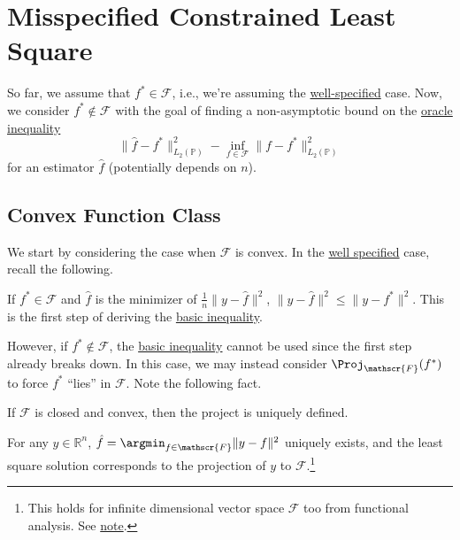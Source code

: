 \section{Misspecified Constrained Least Square}
So far, we assume that \(f^{\ast} \in \mathscr{F} \), i.e., we're assuming the \hyperref[def:well-specified]{well-specified} case. Now, we consider \(f^{\ast} \notin \mathscr{F} \) with the goal of finding a non-asymptotic bound on the \hyperref[eq:oracle-inequality]{oracle inequality}
\[
	\lVert \hat{f} - f^{\ast}  \rVert _{L_2(\mathbb{P} )}^2 - \inf _{f \in \mathscr{F} } \lVert f - f^{\ast}  \rVert _{L_2(\mathbb{P} )} ^2
\]
for an estimator \(\hat{f} \) (potentially depends on \(n\)).

\subsection{Convex Function Class}
We start by considering the case when \(\mathscr{F} \) is convex. In the \hyperref[def:well-specified]{well specified} case, recall the following.

\begin{prev}
	If \(f^{\ast} \in \mathscr{F} \) and \(\hat{f} \) is the minimizer of \(\frac{1}{n} \lVert y - \hat{f} \rVert ^2 \), \(\lVert y - \hat{f} \rVert ^2 \leq \lVert y - f^{\ast} \rVert ^2\). This is the first step of deriving the \hyperref[eq:basic-inequality]{basic inequality}.
\end{prev}

However, if \(f^{\ast} \notin \mathscr{F} \), the \hyperref[eq:basic-inequality]{basic inequality} cannot be used since the first step already breaks down. In this case, we may instead consider \(\Proj_{\mathscr{F} }(f^{\ast} ) \) to force \(f^{\ast} \) ``lies'' in \(\mathscr{F} \). Note the following fact.

\begin{note}
	If \(\mathscr{F} \) is closed and convex, then the project is uniquely defined.
\end{note}
\begin{explanation}
	For any \(y\in \mathbb{R} ^n\), \(\hat{f} = \argmin_{f\in \mathscr{F} } \lVert y - f \rVert ^2\) uniquely exists, and the least square solution corresponds to the projection of \(y\) to \(\mathscr{F} \).\footnote{This holds for infinite dimensional vector space \(\mathscr{F} \) too from functional analysis. See \href{https://www.pbb.wtf/posts/Notes\#functional-analysis-math602}{note}.}
\end{explanation}


